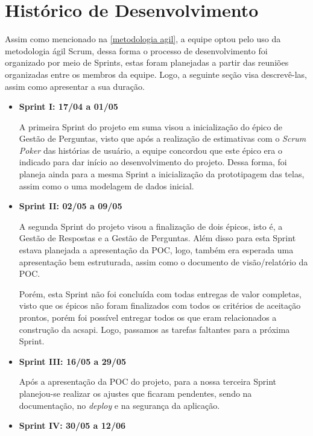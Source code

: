 \chapter{Histórico de Desenvolvimento}
Assim como mencionado na \autoref{metodologia agil}, a equipe optou pelo uso da metodologia ágil Scrum, dessa forma o processo de desenvolvimento foi organizado por meio de \glspl{Sprint}, estas foram planejadas a partir das reuniões organizadas entre os membros da equipe. Logo, a seguinte seção visa descrevê-las, assim como apresentar a sua duração.

\begin{itemize}
\item {\textbf{Sprint I: 17/04 a 01/05}}
    
A primeira \gls{Sprint} do projeto em suma visou a inicialização do épico de Gestão de Perguntas, visto que após a realização de estimativas com o \textsl{Scrum Poker} das histórias de usuário, a equipe concordou que este épico era o indicado para dar início ao desenvolvimento do projeto. Dessa forma, foi planeja ainda para a mesma \gls{Sprint} a inicialização da prototipagem das telas, assim como o uma modelagem de dados inicial.
\item {\textbf{Sprint II: 02/05 a 09/05}}
    
A segunda \gls{Sprint} do projeto visou a finalização de dois épicos, isto é, a Gestão de Respostas e a Gestão de Perguntas. Além disso para esta \gls{Sprint} estava planejada a apresentação da \gls{POC}, logo, também era esperada uma apresentação bem estruturada, assim como o documento de visão/relatório da \gls{POC}. 

Porém, esta \gls{Sprint} não foi concluída com todas entregas de valor completas, visto que os épicos não foram finalizados com todos os critérios de aceitação prontos, porém foi possível entregar todos os que eram relacionados a construção da acs{api}. Logo, passamos as tarefas faltantes para a próxima Sprint.
\item {\textbf{Sprint III: 16/05 a 29/05}}
    
Após a apresentação da \gls{POC} do projeto, para a nossa terceira \gls{Sprint} planejou-se realizar os ajustes que ficaram pendentes, sendo na documentação, no \textit{deploy} e na segurança da aplicação. 
\item {\textbf{Sprint IV: 30/05 a 12/06}}
    

\end{itemize}
